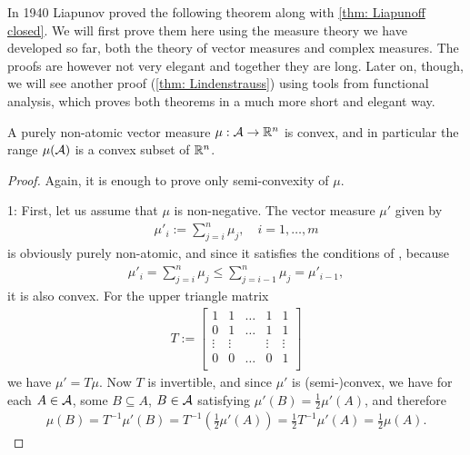 \documentclass[../../main.tex]{subfiles}
\begin{document}
In 1940 Liapunov proved the following theorem along with \cref{thm: Liapunoff closed}. We will first prove them here using the measure theory we have developed so far, both the theory of vector measures and complex measures. The proofs are however not very elegant and together they are long. Later on, though, we will see another proof (\cref{thm: Lindenstrauss}) using tools from functional analysis, which proves both theorems in a much more short and elegant way.

\begin{theorem}[Lyapunov, 1940]\label{thm: Liapunoff convex}
A purely non-atomic vector measure $\mu: \mathcal{A} \to \mathbb{R}^{n}$ is convex, and in particular the range $\mu(\mathcal{A})$ is a convex subset of $\mathbb{R}^{n}$.
\end{theorem}
\begin{proof}
Again, it is enough to prove only semi-convexity of $\mu$.

1: First, let us assume that $\mu$ is non-negative. The vector measure $\mu'$ given by
\begin{align*}
	\mu'_{i}:=\sum_{j=i}^{n}\mu_{j}, \quad i=1, \dots, m
\end{align*}
is obviously purely non-atomic, and since it satisfies the conditions of , because
\begin{align*}
	\mu'_{i}=\sum_{j=i}^{n}\mu_{j} \le \sum_{j=i-1}^{n}\mu_{j} = \mu'_{i-1},
\end{align*}
it is also convex. For the upper triangle matrix
\begin{align*}
	T:=\begin{bmatrix}
	1 & 1 & \dots & 1 & 1 \\
	0 & 1 & \dots & 1 & 1 \\
	\vdots & \vdots &  & \vdots & \vdots \\
	0 & 0 & \dots & 0 & 1 \\
	\end{bmatrix}
\end{align*}
we have $\mu'=T\mu$. Now $T$ is invertible, and since $\mu'$ is (semi-)convex, we have for each $A\in \mathcal{A}$, some $B\subseteq A$, $B\in \mathcal{A}$ satisfying $\mu'(B)=\frac{1}{2}\mu'(A)$, and therefore
\begin{align*}
	\mu(B)=T^{-1}\mu'(B)=T^{-1}\left(\frac{1}{2}\mu'(A)\right) = \frac{1}{2}T^{-1}\mu'(A)=\frac{1}{2}\mu(A).
\end{align*}


\end{proof}
\end{document}
